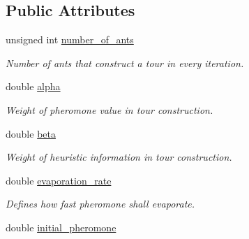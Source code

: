 \subsection*{Public Attributes}
\begin{CompactItemize}
\item 
\hypertarget{classAntColonyConfiguration_3f18abe4272a3281947370750aa24a25}{
unsigned int \hyperlink{classAntColonyConfiguration_3f18abe4272a3281947370750aa24a25}{number\_\-of\_\-ants}}
\label{classAntColonyConfiguration_3f18abe4272a3281947370750aa24a25}

\begin{CompactList}\small\item\em Number of ants that construct a tour in every iteration. \item\end{CompactList}\item 
\hypertarget{classAntColonyConfiguration_dc25fc4205fe334a1715995aca9a32fd}{
double \hyperlink{classAntColonyConfiguration_dc25fc4205fe334a1715995aca9a32fd}{alpha}}
\label{classAntColonyConfiguration_dc25fc4205fe334a1715995aca9a32fd}

\begin{CompactList}\small\item\em Weight of pheromone value in tour construction. \item\end{CompactList}\item 
\hypertarget{classAntColonyConfiguration_bc3f9eeb6f15d3d3712b8a3640397a11}{
double \hyperlink{classAntColonyConfiguration_bc3f9eeb6f15d3d3712b8a3640397a11}{beta}}
\label{classAntColonyConfiguration_bc3f9eeb6f15d3d3712b8a3640397a11}

\begin{CompactList}\small\item\em Weight of heuristic information in tour construction. \item\end{CompactList}\item 
\hypertarget{classAntColonyConfiguration_d75d81f5beb7e47b572c53792500cd6d}{
double \hyperlink{classAntColonyConfiguration_d75d81f5beb7e47b572c53792500cd6d}{evaporation\_\-rate}}
\label{classAntColonyConfiguration_d75d81f5beb7e47b572c53792500cd6d}

\begin{CompactList}\small\item\em Defines how fast pheromone shall evaporate. \item\end{CompactList}\item 
\hypertarget{classAntColonyConfiguration_3ff4ef23212123411b37c43aa2a7f8e1}{
double \hyperlink{classAntColonyConfiguration_3ff4ef23212123411b37c43aa2a7f8e1}{initial\_\-pheromone}}
\label{classAntColonyConfiguration_3ff4ef23212123411b37c43aa2a7f8e1}


\end{CompactItemize}
